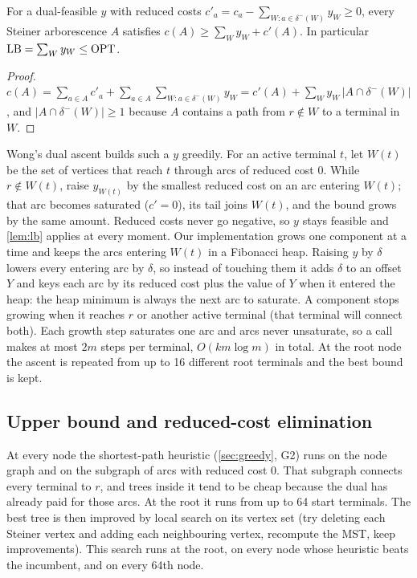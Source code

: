 \begin{lemma}[admissibility]\label{lem:lb}
For a dual-feasible \(y\) with reduced costs \(c'_a=c_a-\sum_{W:a\in\delta^-(W)}y_W\ge0\), every Steiner arborescence \(A\) satisfies
\(c(A)\ge\sum_W y_W+c'(A)\). In particular \(\mathrm{LB}=\sum_Wy_W\le\mathrm{OPT}\).
\end{lemma}
\begin{proof}
\(c(A)=\sum_{a\in A}c'_a+\sum_{a\in A}\sum_{W:a\in\delta^-(W)}y_W=c'(A)+\sum_W y_W\,|A\cap\delta^-(W)|\), and
\(|A\cap\delta^-(W)|\ge1\) because \(A\) contains a path from \(r\notin W\) to a terminal in \(W\).
\end{proof}

Wong's dual ascent builds such a \(y\) greedily. For an active terminal \(t\), let \(W(t)\) be the set of vertices that reach \(t\)
through arcs of reduced cost 0. While \(r\notin W(t)\), raise \(y_{W(t)}\) by the smallest reduced cost on an arc entering \(W(t)\);
that arc becomes saturated (\(c'=0\)), its tail joins \(W(t)\), and the bound grows by the same amount. Reduced costs never go
negative, so \(y\) stays feasible and \cref{lem:lb} applies at every moment. Our implementation grows one component at a time and keeps
the arcs entering \(W(t)\) in a Fibonacci heap. Raising \(y\) by \(\delta\) lowers every entering arc by \(\delta\), so instead of
touching them it adds \(\delta\) to an offset \(Y\) and keys each arc by its reduced cost plus the value of \(Y\) when it entered the heap:
the heap minimum is always the next arc to saturate. A component stops growing when it reaches \(r\) or another active terminal
(that terminal will connect both). Each growth step saturates one arc and arcs never unsaturate, so a call makes at most \(2m\) steps
per terminal, \(O(km\log m)\) in total. At the root node the ascent is repeated from up to 16 different root terminals and the best bound
is kept.

\subsection{Upper bound and reduced-cost elimination}\label{sec:elim}
At every node the shortest-path heuristic (\cref{sec:greedy}, G2) runs on the node graph and on the subgraph of arcs with reduced cost
0. That subgraph connects every terminal to \(r\), and trees inside it tend to be cheap because the dual has already paid for those
arcs. At the root it runs from up to 64 start terminals. The best tree is then improved by local search on its vertex set (try deleting
each Steiner vertex and adding each neighbouring vertex, recompute the MST, keep improvements). This search runs at the root, on every
node whose heuristic beats the incumbent, and on every 64th node.

